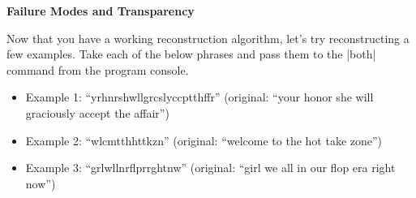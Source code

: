 \item {\bf Failure Modes and Transparency}

Now that you have a working reconstruction algorithm, let’s try reconstructing a few examples. Take each of the below phrases and pass them to the |both| command from the program console.

\begin{itemize}
  \item Example 1: “yrhnrshwllgrcslyccptthffr” (original: “your honor she will graciously accept the affair”)
  \item Example 2: “wlcmtthhttkzn” (original: “welcome to the hot take zone”)
  \item Example 3: “grlwllnrflprrghtnw” (original: “girl we all in our flop era right now”)
\end{itemize}

\begin{enumerate}

  

  

  

\end{enumerate}
